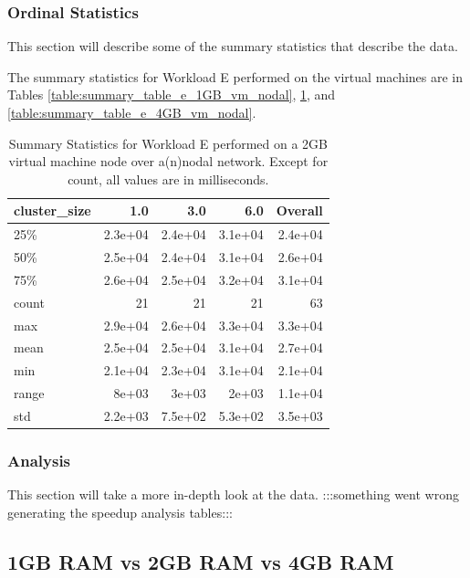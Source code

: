 \subsubsection{Ordinal Statistics}
This section will describe some of the summary statistics that describe the data.  

The summary statistics for Workload E performed on the virtual machines are in Tables \ref{table:summary_table_e_1GB_vm_nodal}, \ref{table:summary_table_e_2GB_vm_nodal}, and \ref{table:summary_table_e_4GB_vm_nodal}.
\begin{table}
\begin{tabular}{lrrrr}
\toprule
cluster\_size &     1.0 &     3.0 &     6.0 &  Overall \\
\midrule
25\%   & 2.3e+04 & 2.4e+04 & 3.1e+04 &  2.4e+04 \\
50\%   & 2.5e+04 & 2.4e+04 & 3.1e+04 &  2.6e+04 \\
75\%   & 2.6e+04 & 2.5e+04 & 3.2e+04 &  3.1e+04 \\
count &      21 &      21 &      21 &       63 \\
max   & 2.9e+04 & 2.6e+04 & 3.3e+04 &  3.3e+04 \\
mean  & 2.5e+04 & 2.5e+04 & 3.1e+04 &  2.7e+04 \\
min   & 2.1e+04 & 2.3e+04 & 3.1e+04 &  2.1e+04 \\
range &   8e+03 &   3e+03 &   2e+03 &  1.1e+04 \\
std   & 2.2e+03 & 7.5e+02 & 5.3e+02 &  3.5e+03 \\
\bottomrule
\end{tabular}
\caption{Summary Statistics for Workload E performed on a 2GB virtual machine node over a(n)nodal network.  Except for count, all values are in milliseconds.}
\label{table:summary_table_e_2GB_vm_nodal}
\end{table}



\subsubsection{Analysis}
This section will take a more in-depth look at the data.
:::something went wrong generating the speedup analysis tables:::

\subsection{1GB RAM vs 2GB RAM vs 4GB RAM}
